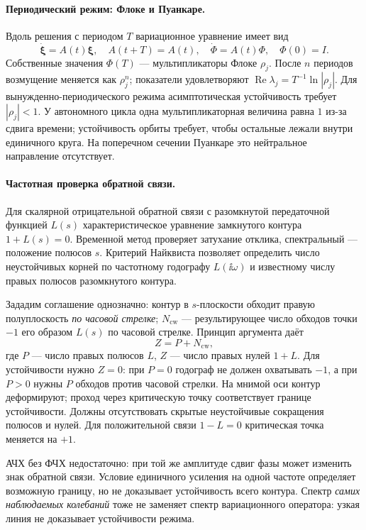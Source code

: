 \paragraph{Периодический режим: Флоке и Пуанкаре.}
Вдоль решения с периодом $T$ вариационное уравнение имеет вид
\begin{equation}
 \dot{\bm\xi}=A(t)\bm\xi,\quad A(t+T)=A(t),\quad
 \dot\Phi=A(t)\Phi,\quad\Phi(0)=I.
\end{equation}
Собственные значения $\Phi(T)$ --- мультипликаторы Флоке $\rho_j$. После $n$ периодов возмущение меняется как $\rho_j^n$; показатели удовлетворяют $\operatorname{Re}\lambda_j=T^{-1}\ln|\rho_j|$. Для вынужденно-периодического режима асимптотическая устойчивость требует $|\rho_j|<1$. У автономного цикла одна мультипликаторная величина равна $1$ из-за сдвига времени; устойчивость орбиты требует, чтобы остальные лежали внутри единичного круга. На поперечном сечении Пуанкаре это нейтральное направление отсутствует.

\paragraph{Частотная проверка обратной связи.}
Для скалярной отрицательной обратной связи с разомкнутой передаточной функцией $L(s)$ характеристическое уравнение замкнутого контура $1+L(s)=0$. Временной метод проверяет затухание отклика, спектральный --- положение полюсов $s$. Критерий Найквиста позволяет определить число неустойчивых корней по частотному годографу $L(\ii\omega)$ и известному числу правых полюсов разомкнутого контура.

Зададим соглашение однозначно: контур в $s$-плоскости обходит правую полуплоскость \emph{по часовой стрелке}; $N_{\mathrm{cw}}$ --- результирующее число обходов точки $-1$ его образом $L(s)$ по часовой стрелке. Принцип аргумента даёт
\begin{equation}
 Z=P+N_{\mathrm{cw}},
\end{equation}
где $P$ --- число правых полюсов $L$, $Z$ --- число правых нулей $1+L$. Для устойчивости нужно $Z=0$: при $P=0$ годограф не должен охватывать $-1$, а при $P>0$ нужны $P$ обходов против часовой стрелки. На мнимой оси контур деформируют; проход через критическую точку соответствует границе устойчивости. Должны отсутствовать скрытые неустойчивые сокращения полюсов и нулей. Для положительной связи $1-L=0$ критическая точка меняется на $+1$.

АЧХ без ФЧХ недостаточно: при той же амплитуде сдвиг фазы может изменить знак обратной связи. Условие единичного усиления на одной частоте определяет возможную границу, но не доказывает устойчивость всего контура. Спектр \emph{самих наблюдаемых колебаний} тоже не заменяет спектр вариационного оператора: узкая линия не доказывает устойчивости режима.
